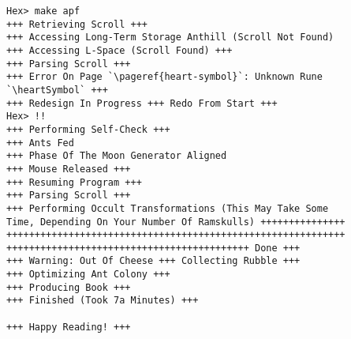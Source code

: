 \begin{lrbox}{\preambleBox}%
\begin{lstlisting}
Hex> make apf
+++ Retrieving Scroll +++
+++ Accessing Long-Term Storage Anthill (Scroll Not Found)
+++ Accessing L-Space (Scroll Found) +++
+++ Parsing Scroll +++
+++ Error On Page `\pageref{heart-symbol}`: Unknown Rune `\heartSymbol` +++
+++ Redesign In Progress +++ Redo From Start +++
Hex> !!
+++ Performing Self-Check +++
+++ Ants Fed
+++ Phase Of The Moon Generator Aligned
+++ Mouse Released +++
+++ Resuming Program +++
+++ Parsing Scroll +++
+++ Performing Occult Transformations (This May Take Some
Time, Depending On Your Number Of Ramskulls) +++++++++++++++
++++++++++++++++++++++++++++++++++++++++++++++++++++++++++++
+++++++++++++++++++++++++++++++++++++++++++ Done +++
+++ Warning: Out Of Cheese +++ Collecting Rubble +++
+++ Optimizing Ant Colony +++
+++ Producing Book +++
+++ Finished (Took 7a Minutes) +++

+++ Happy Reading! +++
\end{lstlisting}
\end{lrbox}
